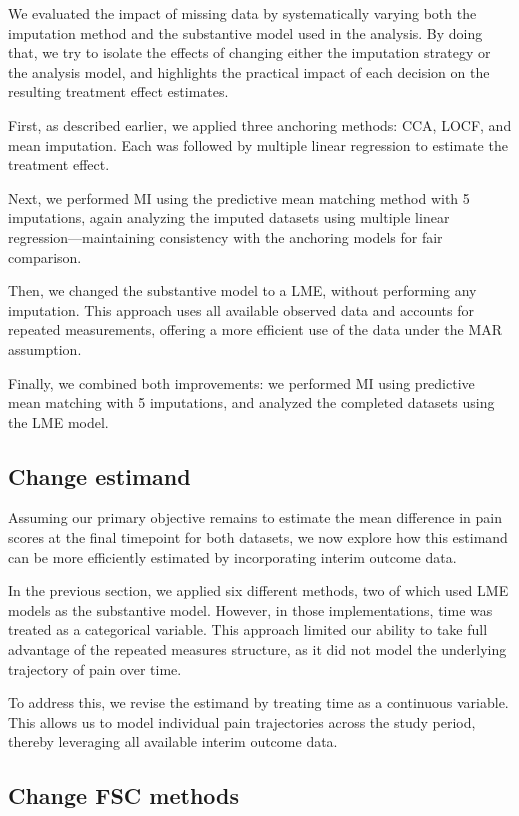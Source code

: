 \documentclass{article}
\begin{document}
We evaluated the impact of missing data by systematically varying both
the imputation method and the substantive model used in the analysis. By
doing that, we try to isolate the effects of changing either the
imputation strategy or the analysis model, and highlights the practical
impact of each decision on the resulting treatment effect estimates.

First, as described earlier, we applied three anchoring methods: CCA,
LOCF, and mean imputation. Each was followed by multiple linear
regression to estimate the treatment effect.

Next, we performed MI using the predictive mean matching method with 5
imputations, again analyzing the imputed datasets using multiple linear
regression---maintaining consistency with the anchoring models for fair
comparison.

Then, we changed the substantive model to a LME, without performing any
imputation. This approach uses all available observed data and accounts
for repeated measurements, offering a more efficient use of the data
under the MAR assumption.

Finally, we combined both improvements: we performed MI using predictive
mean matching with 5 imputations, and analyzed the completed datasets
using the LME model.

\subsection{Change estimand}\label{change-estimand}

Assuming our primary objective remains to estimate the mean difference
in pain scores at the final timepoint for both datasets, we now explore
how this estimand can be more efficiently estimated by incorporating
interim outcome data.

In the previous section, we applied six different methods, two of which
used LME models as the substantive model. However, in those
implementations, time was treated as a categorical variable. This
approach limited our ability to take full advantage of the repeated
measures structure, as it did not model the underlying trajectory of
pain over time.

To address this, we revise the estimand by treating time as a continuous
variable. This allows us to model individual pain trajectories across
the study period, thereby leveraging all available interim outcome data.

\subsection{Change FSC methods}\label{change-fsc-methods}
\end{document}
